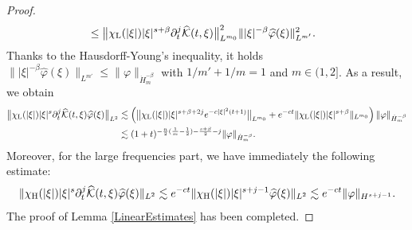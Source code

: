 \documentclass[11pt,reqno]{amsart}
\begin{document}
\begin{proof}
\begin{align*}
     &\leq \big\|\chi_{\rm L}(|\xi|)|\xi|^{s+\beta}\partial_t^j\widehat{\mathcal{K}}(t,\xi)\big\|_{L^{m_0}}^2 \||\xi|^{-\beta}\widehat{\varphi}(\xi)\|_{L^{m'}}^2.
\end{align*}
Thanks to the Hausdorff-Young's inequality, it holds $\||\xi|^{-\beta}\widehat{\varphi}(\xi)\|_{L^{m'}} \leq \|\varphi\|_{\dot{H}_m^{-\beta}}$ with $1/m' + 1/m = 1$  and $m \in (1,2]$. As a result, we obtain
\begin{align*}
     \big\|\chi_{\rm L}(|\xi|)|\xi|^{s}\partial_t^j\widehat{\mathcal{K}}(t,\xi) \widehat{\varphi}(\xi)\big\|_{L^2} &\lesssim \left(\big\|\chi_{\rm L}(|\xi|)|\xi|^{s+\beta+2j} e^{-c|\xi|^{2}(t+1)}\big\|_{L^{m_0}} + e^{-ct} \|\chi_{\rm L}(|\xi|) |\xi|^{s+\beta}\|_{L^{m_0}}\right) \|\varphi\|_{\dot{H}_m^{-\beta}}\\
     &\lesssim (1+t)^{-\frac{n}{2}(\frac{1}{m}-\frac{1}{2})-\frac{s+\beta}{2}-j} \|\varphi\|_{\dot{H}_m^{-\beta}}.
\end{align*}
Moreover, for the large frequencies part, we have immediately the following estimate:
$$
\|\chi_{\rm H}(|\xi|)|\xi|^{s}\partial_t^j \widehat{\mathcal{K}}(t,\xi)\widehat{\varphi}(\xi)\|_{L^2} \lesssim e^{-ct}\|\chi_{\rm H}(|\xi|)|\xi|^{s+j-1} \widehat{\varphi}(\xi)\|_{L^2} \lesssim e^{-ct} \|\varphi\|_{H^{s+j-1}}.
$$ 
The proof of Lemma \ref{LinearEstimates} has been completed.    
\end{proof}
\end{document}
